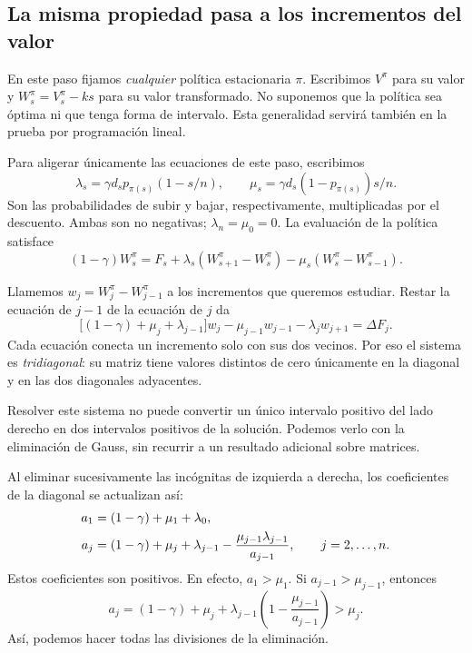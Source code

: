 \documentclass[11pt,a4paper]{article}
\begin{document}
\subsection{La misma propiedad pasa a los incrementos del valor}
\label{sec:signos-W}

En este paso fijamos \emph{cualquier} política estacionaria $\pi$.
Escribimos $V^\pi$ para su valor y $W_s^\pi=V_s^\pi-ks$ para su
valor transformado. No suponemos que la política sea óptima ni que
tenga forma de intervalo. Esta generalidad servirá también en la
prueba por programación lineal.

Para aligerar únicamente las ecuaciones de este paso, escribimos
\[
\lambda_s=\gamma d_s p_{\pi(s)}(1-s/n),\qquad
\mu_s=\gamma d_s(1-p_{\pi(s)})s/n.
\]
Son las probabilidades de subir y bajar, respectivamente, multiplicadas
por el descuento. Ambas son no negativas; $\lambda_n=\mu_0=0$.
La evaluación de la política satisface
\begin{equation}
(1-\gamma)W_s^\pi=F_s
 +\lambda_s(W_{s+1}^\pi-W_s^\pi)
 -\mu_s(W_s^\pi-W_{s-1}^\pi).
\label{eq:fixed-policy}
\end{equation}

Llamemos $w_j=W_j^\pi-W_{j-1}^\pi$ a los incrementos que queremos
estudiar. Restar la ecuación de $j-1$ de la ecuación de $j$ da
\begin{equation}
\bigl[(1-\gamma)+\mu_j+\lambda_{j-1}\bigr]w_j
 -\mu_{j-1}w_{j-1}-\lambda_jw_{j+1}
 =\Delta F_j.
\label{eq:tridiagonal}
\end{equation}
Cada ecuación conecta un incremento solo con sus dos vecinos.
Por eso el sistema es \emph{tridiagonal}: su matriz tiene valores
distintos de cero únicamente en la diagonal y en las dos diagonales
adyacentes.

Resolver este sistema no puede convertir un único intervalo positivo
del lado derecho en dos intervalos positivos de la solución. Podemos
verlo con la eliminación de Gauss, sin recurrir a un resultado
adicional sobre matrices.

Al eliminar sucesivamente las incógnitas de izquierda a derecha,
los coeficientes de la diagonal se actualizan así:
\begin{align}
a_1&=(1-\gamma)+\mu_1+\lambda_0,\notag\\
a_j&=(1-\gamma)+\mu_j+\lambda_{j-1}
       -\frac{\mu_{j-1}\lambda_{j-1}}{a_{j-1}},
\qquad j=2,\ldots,n.
\label{eq:pivots}
\end{align}
Estos coeficientes son positivos. En efecto, $a_1>\mu_1$. Si
$a_{j-1}>\mu_{j-1}$, entonces
\[
a_j=(1-\gamma)+\mu_j+
\lambda_{j-1}\left(1-\frac{\mu_{j-1}}{a_{j-1}}\right)>\mu_j.
\]
Así, podemos hacer todas las divisiones de la eliminación.
\end{document}
